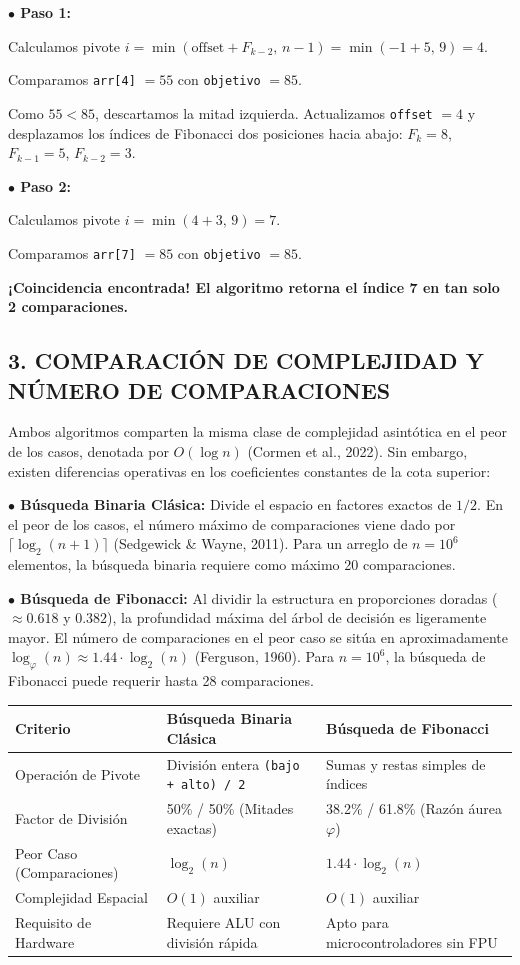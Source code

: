 \documentclass[12pt,a4paper]{article}
\begin{document}
\textbf{$\bullet$ Paso 1:}

Calculamos pivote $i = \min(\text{offset} + F_{k-2},\, n-1) = \min(-1 + 5,\, 9) = 4$.

Comparamos \texttt{arr[4]} $= 55$ con \texttt{objetivo} $= 85$.

Como $55 < 85$, descartamos la mitad izquierda. Actualizamos \texttt{offset} $= 4$ y desplazamos
los índices de Fibonacci dos posiciones hacia abajo: $F_k = 8$, $F_{k-1} = 5$, $F_{k-2} = 3$.

\textbf{$\bullet$ Paso 2:}

Calculamos pivote $i = \min(4 + 3,\, 9) = 7$.

Comparamos \texttt{arr[7]} $= 85$ con \texttt{objetivo} $= 85$.

\textbf{¡Coincidencia encontrada! El algoritmo retorna el índice 7 en tan solo 2 comparaciones.}

\subsection*{3. COMPARACIÓN DE COMPLEJIDAD Y NÚMERO DE COMPARACIONES}

Ambos algoritmos comparten la misma clase de complejidad asintótica en el peor de los casos,
denotada por $O(\log n)$ (Cormen et al., 2022). Sin embargo, existen diferencias operativas en
los coeficientes constantes de la cota superior:

\textbf{$\bullet$ Búsqueda Binaria Clásica:} Divide el espacio en factores exactos de $1/2$. En
el peor de los casos, el número máximo de comparaciones viene dado por
$\lceil \log_2(n + 1) \rceil$ (Sedgewick \& Wayne, 2011). Para un arreglo de $n = 10^6$
elementos, la búsqueda binaria requiere como máximo 20 comparaciones.

\textbf{$\bullet$ Búsqueda de Fibonacci:} Al dividir la estructura en proporciones doradas
($\approx 0.618$ y $0.382$), la profundidad máxima del árbol de decisión es ligeramente mayor. El
número de comparaciones en el peor caso se sitúa en aproximadamente
$\log_\varphi(n) \approx 1.44 \cdot \log_2(n)$ (Ferguson, 1960). Para $n = 10^6$, la búsqueda de
Fibonacci puede requerir hasta 28 comparaciones.

\begin{center}
\begin{tabularx}{\textwidth}{|p{3.2cm}|X|X|}
\hline
\textbf{Criterio} & \textbf{Búsqueda Binaria Clásica} & \textbf{Búsqueda de Fibonacci} \\
\hline
Operación de Pivote & División entera \texttt{(bajo + alto) / 2} & Sumas y restas simples de índices \\
\hline
Factor de División & 50\% / 50\% (Mitades exactas) & 38.2\% / 61.8\% (Razón áurea $\varphi$) \\
\hline
Peor Caso (Comparaciones) & $\log_2(n)$ & $1.44 \cdot \log_2(n)$ \\
\hline
Complejidad Espacial & $O(1)$ auxiliar & $O(1)$ auxiliar \\
\hline
Requisito de Hardware & Requiere ALU con división rápida & Apto para microcontroladores sin FPU \\
\hline
\end{tabularx}
\end{center}
\end{document}
